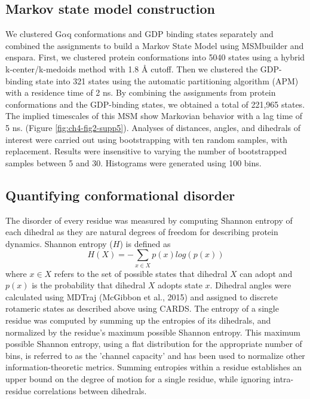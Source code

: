 \documentclass[../main.tex]{subfiles}
\begin{document}
    \subsection{Markov state model construction}
        We clustered G$\alpha$q conformations and GDP binding states separately and combined the assignments to build a Markov State Model using MSMbuilder \cite{Beauchamp:2011he,Bowman:2009cb} and enspara\cite{porter2018enspara}. First, we clustered protein conformations into 5040 states using a hybrid k-center/k-medoids method with 1.8 \AA{} cutoff. Then we clustered the GDP-binding state into 321 states using the automatic partitioning algorithm (APM)\cite{Sheong:2015jd} with a residence time of 2 ns. By combining the assignments from protein conformations and the GDP-binding states, we obtained a total of 221,965 states. The implied timescales of this MSM show Markovian behavior with a lag time of 5 ns\cite{Swope:2004gx}. (Figure  \ref{fig:ch4-fig2-supp5}). Analyses of distances, angles, and dihedrals of interest were carried out using bootstrapping with ten random samples, with replacement. Results were insensitive to varying the number of bootstrapped samples between 5 and 30. Histograms were generated using 100 bins.

    \subsection{Quantifying conformational disorder}
        The disorder of every residue was measured by computing Shannon entropy\cite{Shannon:1948iy} of each dihedral as they are natural degrees of freedom for describing protein dynamics. Shannon entropy ($H$) is defined as
        \begin{equation}\label{mut-inf-eq}
            H(X)=-\sum_{x\in X}p(x)log(p(x))
        \end{equation}
        where $x \in X$ refers to the set of possible states that dihedral $X$ can adopt and $p(x)$ is the probability that dihedral $X$ adopts state $x$. Dihedral angles were calculated using MDTraj (McGibbon et al., 2015) and assigned to discrete rotameric states as described above using CARDS. The entropy of a single residue was computed by summing up the entropies of its dihedrals, and normalized by the residue’s maximum possible Shannon entropy. This maximum possible Shannon entropy, using a flat distribution for the appropriate number of bins, is referred to as the 'channel capacity' and has been used to normalize other information-theoretic metrics\cite{Singh:2017hh}. Summing entropies within a residue establishes an upper bound on the degree of motion for a single residue, while ignoring intra-residue correlations between dihedrals.
\end{document}
